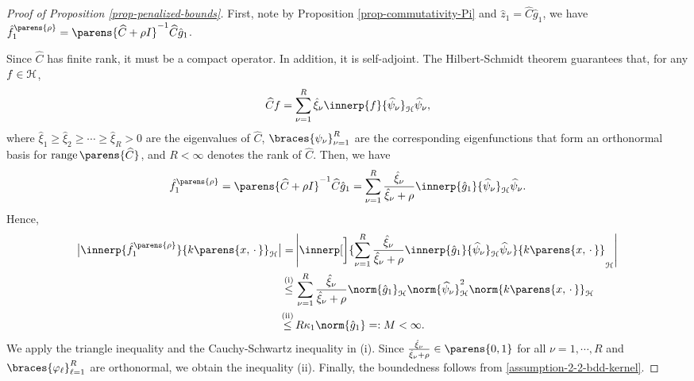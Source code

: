 \begin{proof}[Proof of Proposition \ref{prop-penalized-bounds}]
	First, note by Proposition \ref{prop-commutativity-Pi} and $\hat{z}_1 = \widehat{C} \hat{g}_1$, we have $\hat{f}_{1}^{\parens{\rho}} = \parens{\widehat{C} + \rho I}^{-1} \widehat{C} \hat{g}_1$. 
	
	Since $\widehat{C}$ has finite rank, it must be a compact operator. In addition, it is self-adjoint. The Hilbert-Schmidt theorem guarantees that, for any $f \in \mathcal{H}$, 
	\begin{align*}
		\widehat{C} f = \sum_{\nu=1}^R \hat{\xi}_{\nu} \innerp{f}{\widehat{\psi}_{\nu}}_{\calH} \widehat{\psi}_{\nu}, 
	\end{align*}
	where $\hat{\xi}_1 \ge \hat{\xi}_2 \ge \cdots \ge \hat{\xi}_R > 0$ are the eigenvalues of $\widehat{C}$, $\braces{\psi_{\nu}}_{\nu=1}^R$ are the corresponding eigenfunctions that form an orthonormal basis for $\range \parens{\widehat{C}}$, and $R < \infty$ denotes the rank of $\widehat{C}$. Then, we have 
	\begin{align*}
		\hat{f}_1^{\parens{\rho}} = \parens{\widehat{C} + \rho I}^{-1} \widehat{C} \hat{g}_1 = \sum_{\nu=1}^R \frac{\hat{\xi}_{\nu}}{\hat{\xi}_{\nu} + \rho} \innerp{\hat{g}_1}{\widehat{\psi}_{\nu}}_{\calH} \widehat{\psi}_{\nu}. 
	\end{align*}
	Hence, 
	\begin{align*}
		\abs[\big]{\innerp{\hat{f}_1^{\parens{\rho}}}{k \parens{x, \,\cdot\,}}_{\calH}} = & \, \abs[\Bigg]{\innerp[\bigg]{\sum_{\nu=1}^R \frac{\hat{\xi}_{\nu}}{\hat{\xi}_{\nu} + \rho} \innerp{\hat{g}_1}{\widehat{\psi}_{\nu}}_{\calH} \widehat{\psi}_{\nu}}{k \parens{x, \,\cdot\,}}_{\calH}} \\
		\stackrel{\text{(i)}}{\le} & \, \sum_{\nu=1}^R \frac{\hat{\xi}_{\nu}}{\hat{\xi}_{\nu} + \rho} \norm{\hat{g}_1}_{\calH} \norm{\widehat{\psi}_{\nu}}_{\calH}^2 \norm{k \parens{x, \,\cdot\,}}_{\calH} \\ 
		\stackrel{\text{(ii)}}{\le} & \, R \kappa_1 \norm{\hat{g}_1} =: M < \infty. 
	\end{align*}
	We apply the triangle inequality and the Cauchy-Schwartz inequality in (i). Since $\frac{\hat{\xi}_{\nu}}{\hat{\xi}_{\nu} + \rho} \in \parens{0, 1}$ for all $\nu = 1, \cdots, R$ and $\braces{\varphi_{\ell}}_{\ell=1}^R$ are orthonormal, we obtain the inequality (ii). Finally, the boundedness follows from \ref{assumption-2-2-bdd-kernel}. 
\end{proof}

